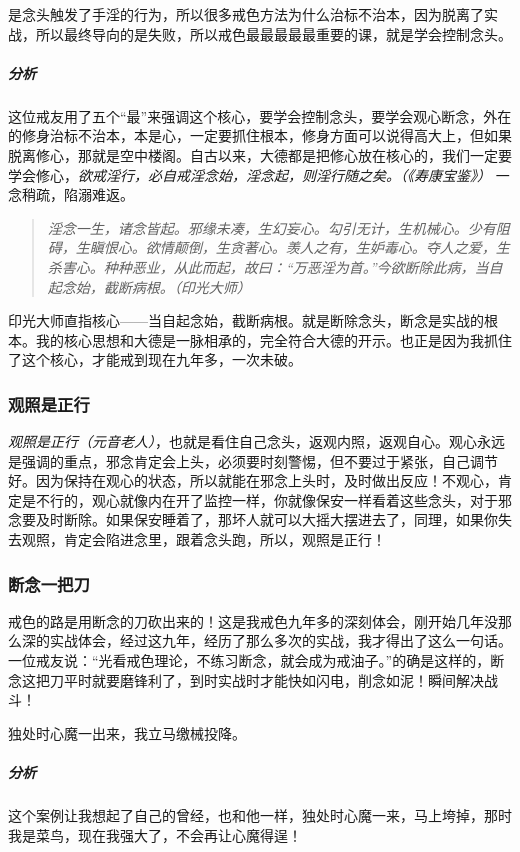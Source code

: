 \begin{case}
    是念头触发了手淫的行为，所以很多戒色方法为什么治标不治本，因为脱离了实战，所以最终导向的是失败，所以戒色最最最最最重要的课，就是学会控制念头。
    \subparagraph{分析} 这位戒友用了五个“最”来强调这个核心，要学会控制念头，要学会观心断念，外在的修身治标不治本，本是心，一定要抓住根本，修身方面可以说得高大上，但如果脱离修心，那就是空中楼阁。自古以来，大德都是把修心放在核心的，我们一定要学会修心，\textit{欲戒淫行，必自戒淫念始，淫念起，则淫行随之矣。（《寿康宝鉴》）} 一念稍疏，陷溺难返。

    \begin{quote}\it
        淫念一生，诸念皆起。邪缘未凑，生幻妄心。勾引无计，生机械心。少有阻碍，生瞋恨心。欲情颠倒，生贪著心。羡人之有，生妒毒心。夺人之爱，生杀害心。种种恶业，从此而起，故曰：“万恶淫为首。”今欲断除此病，当自起念始，截断病根。（印光大师）
    \end{quote}

    印光大师直指核心——当自起念始，截断病根。就是断除念头，断念是实战的根本。我的核心思想和大德是一脉相承的，完全符合大德的开示。也正是因为我抓住了这个核心，才能戒到现在九年多，一次未破。
\end{case}

\subsubsection{观照是正行}

\textit{观照是正行（元音老人）}，也就是看住自己念头，返观内照，返观自心。观心永远是强调的重点，邪念肯定会上头，必须要时刻警惕，但不要过于紧张，自己调节好。因为保持在观心的状态，所以就能在邪念上头时，及时做出反应！不观心，肯定是不行的，观心就像内在开了监控一样，你就像保安一样看着这些念头，对于邪念要及时断除。如果保安睡着了，那坏人就可以大摇大摆进去了，同理，如果你失去观照，肯定会陷进念里，跟着念头跑，所以，观照是正行！

\subsubsection{断念一把刀}

戒色的路是用断念的刀砍出来的！这是我戒色九年多的深刻体会，刚开始几年没那么深的实战体会，经过这九年，经历了那么多次的实战，我才得出了这么一句话。一位戒友说：“光看戒色理论，不练习断念，就会成为戒油子。”的确是这样的，断念这把刀平时就要磨锋利了，到时实战时才能快如闪电，削念如泥！瞬间解决战斗！

\begin{case}
    独处时心魔一出来，我立马缴械投降。
    \subparagraph{分析} 这个案例让我想起了自己的曾经，也和他一样，独处时心魔一来，马上垮掉，那时我是菜鸟，现在我强大了，不会再让心魔得逞！
\end{case}

